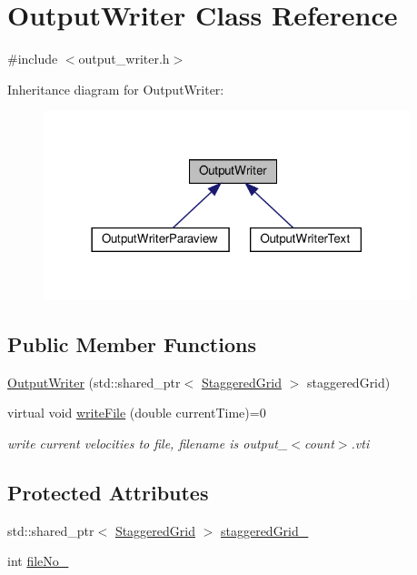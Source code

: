 \hypertarget{classOutputWriter}{}\section{Output\+Writer Class Reference}
\label{classOutputWriter}


{\ttfamily \#include $<$output\+\_\+writer.\+h$>$}



Inheritance diagram for Output\+Writer\+:\nopagebreak
\begin{figure}[H]
\begin{center}
\leavevmode
\includegraphics[width=302pt]{classOutputWriter__inherit__graph}
\end{center}
\end{figure}
\subsection*{Public Member Functions}
\begin{DoxyCompactItemize}
\item 
\mbox{\hyperlink{classOutputWriter_ab4b0b2f2bfe8157c8436b20e9d860fe8}{Output\+Writer}} (std\+::shared\+\_\+ptr$<$ \mbox{\hyperlink{classStaggeredGrid}{Staggered\+Grid}} $>$ staggered\+Grid)
\item 
virtual void \mbox{\hyperlink{classOutputWriter_ac625c204affdc05919388a3549c2e945}{write\+File}} (double current\+Time)=0
\begin{DoxyCompactList}\small\item\em write current velocities to file, filename is output\+\_\+$<$count$>$.\+vti \end{DoxyCompactList}\end{DoxyCompactItemize}
\subsection*{Protected Attributes}
\begin{DoxyCompactItemize}
\item 
std\+::shared\+\_\+ptr$<$ \mbox{\hyperlink{classStaggeredGrid}{Staggered\+Grid}} $>$ \mbox{\hyperlink{classOutputWriter_aa4590ca5293e6d74c59f166596e8c878}{staggered\+Grid\+\_\+}}
\item 
int \mbox{\hyperlink{classOutputWriter_a69d167e2526407602dce26ca7a2b9248}{file\+No\+\_\+}}
\end{DoxyCompactItemize}


